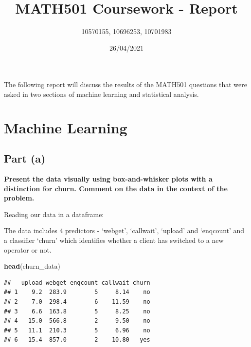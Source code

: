 \documentclass[
]{article}
\title{MATH501 Coursework - Report}
\author{10570155, 10696253, 10701983}
\date{26/04/2021}
\newenvironment{Shaded}{\begin{snugshade}}{\end{snugshade}}
\newcommand{\CommentTok}[1]{\textcolor[rgb]{0.56,0.35,0.01}{\textit{#1}}}
\newcommand{\DataTypeTok}[1]{\textcolor[rgb]{0.13,0.29,0.53}{#1}}
\newcommand{\KeywordTok}[1]{\textcolor[rgb]{0.13,0.29,0.53}{\textbf{#1}}}
\newcommand{\NormalTok}[1]{#1}
\newcommand{\OperatorTok}[1]{\textcolor[rgb]{0.81,0.36,0.00}{\textbf{#1}}}
\newcommand{\StringTok}[1]{\textcolor[rgb]{0.31,0.60,0.02}{#1}}
\begin{document}
\maketitle

The following report will discuss the results of the MATH501 questions
that were asked in two sections of machine learning and statistical
analysis.

\hypertarget{machine-learning}{%
\section{Machine Learning}\label{machine-learning}}

\hypertarget{part-a}{%
\subsection{Part (a)}\label{part-a}}

\textbf{Present the data visually using box-and-whisker plots with a
distinction for churn. Comment on the data in the context of the
problem.}

Reading our data in a dataframe:

\begin{Shaded}
\end{Shaded}

The data includes 4 predictors - `webget', `callwait', `upload' and
`enqcount' and a classifier `churn' which identifies whether a client
has switched to a new operator or not.

\begin{Shaded}
\begin{Highlighting}[]
\KeywordTok{head}\NormalTok{(churn_data)}
\end{Highlighting}
\end{Shaded}

\begin{verbatim}
##   upload webget enqcount callwait churn
## 1    9.2  283.9        5     8.14    no
## 2    7.0  298.4        6    11.59    no
## 3    6.6  163.8        5     8.25    no
## 4   15.0  566.8        2     9.50    no
## 5   11.1  210.3        5     6.96    no
## 6   15.4  857.0        2    10.80   yes
\end{verbatim}
\end{document}
